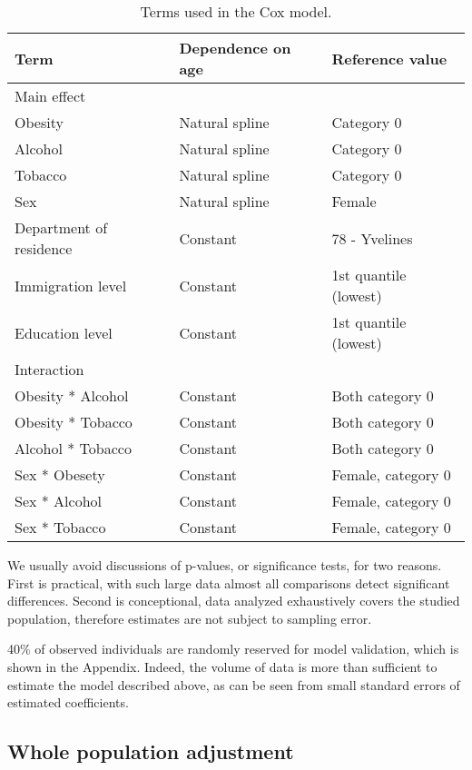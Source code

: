 \documentclass[risks,article,submit,moreauthors,pdftex]{Definitions/mdpi}
\begin{document}
\begin{table}\begin{longtable}{lll}
\caption{
\label{tab:cox_terms}Terms used in the Cox model.
} \\ 
\toprule
Term & Dependence on age & Reference value \\ 
\midrule
\multicolumn{3}{l}{Main effect} \\ 
\midrule
Obesity & Natural spline & Category 0 \\ 
Alcohol & Natural spline & Category 0 \\ 
Tobacco & Natural spline & Category 0 \\ 
Sex & Natural spline & Female \\ 
Department of residence & Constant & 78 - Yvelines \\ 
Immigration level & Constant & 1st quantile (lowest) \\ 
Education level & Constant & 1st quantile (lowest) \\ 
\midrule
\multicolumn{3}{l}{Interaction} \\ 
\midrule
Obesity * Alcohol & Constant & Both category 0 \\ 
Obesity * Tobacco & Constant & Both category 0 \\ 
Alcohol * Tobacco & Constant & Both category 0 \\ 
Sex * Obesety & Constant & Female, category 0 \\ 
Sex * Alcohol & Constant & Female, category 0 \\ 
Sex * Tobacco & Constant & Female, category 0 \\ 
\bottomrule
\end{longtable}
\end{table}

We usually avoid discussions of p-values, or significance tests, for two
reasons. First is practical, with such large data almost all comparisons
detect significant differences. Second is conceptional, data analyzed
exhaustively covers the studied population, therefore estimates are not
subject to sampling error.

40\% of observed individuals are randomly reserved for model validation,
which is shown in the Appendix. Indeed, the volume of data is more than
sufficient to estimate the model described above, as can be seen from
small standard errors of estimated coefficients.

\hypertarget{whole-population-adjustment}{%
\subsection{\texorpdfstring{Whole population adjustment
\label{sec:whole_pop_adj}}{Whole population adjustment }}\label{whole-population-adjustment}}
\end{document}
